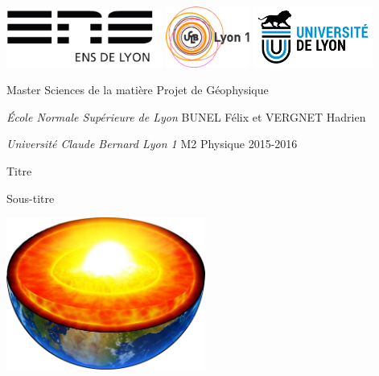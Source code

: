 \documentclass[10pt,a4paper]{article}
\author{Bunel Félix et Vergnet Hadrien}
\numberwithin{equation}{section}
\begin{document}
\begin{titlepage}
\thispagestyle{empty}
\setlength{\parindent}{0pt}

\includegraphics[height=1.9cm]{logo-ens.jpg} \hfill \includegraphics[height=2cm]{logo_lyon1.jpg} \hfill \includegraphics[height=2cm]{logo_univ_lyon.jpg}



Master Sciences de la matière
\hfill
Projet de Géophysique

\textit{École Normale Supérieure de Lyon}
\hfill
BUNEL Félix et VERGNET Hadrien

\textit{Université Claude Bernard Lyon 1}
\hfill
M2 Physique 2015-2016
\vspace{0.5cm}

\hrulefill
\vspace{-0.6cm}

\hrulefill
\begin{center}\bfseries
\begin{huge}
    Titre
\end{huge}
\Large
\vspace{0.4cm}

Sous-titre
\end{center}
\hrulefill
\vspace{-0.6cm}

\hrulefill


\begin{center}
\includegraphics[height=5cm]{figures/terre_core.pdf} 
\end{center} 



\end{titlepage}
\end{document}

